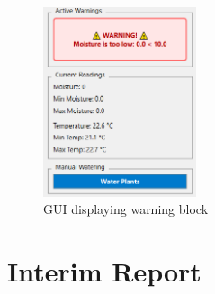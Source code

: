 \documentclass[a4paper,11pt]{article}
\begin{document}
\begin{figure}[H]
    \centering
    \includegraphics[width=0.4\textwidth]{4 - Warning.png}
    \caption{GUI displaying warning block}
    \label{fig:warning_block}
\end{figure}

\section{Interim Report}
\end{document}
